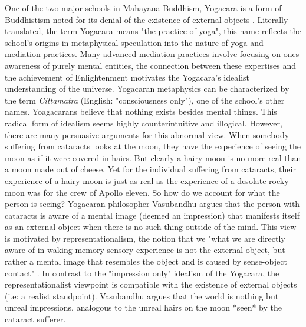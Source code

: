  One of the two major schools in Mahayana Buddhism, Yogacara is a form of Buddhistism noted for its denial of the existence of external objects \cite{siderits2007buddhism} . Literally translated, the term Yogacara means "the practice of yoga", this name reflects the school's origins in metaphysical speculation into the nature of yoga and mediation practices. Many advanced mediation practices involve focusing on ones awareness of purely mental entities, the connection between these expertises and the achievement of Enlightenment motivates the Yogacara's idealist understanding of the universe. Yogacaran metaphysics can be characterized by the term \textit{Cittamatra} (English: "consciousness only"), one of the school's other names. Yoagacarans believe that nothing exists besides mental things. This radical form of idealism seems highly counterintuitive and illogical. However, there are many persuasive arguments for this abnormal view. When somebody suffering from cataracts looks at the moon, they have the experience of seeing the moon as if it were covered in hairs. But clearly a hairy moon is no more real than a moon made out of cheese. Yet for the individual suffering from cataracts, their experience of a hairy moon is just as real as the experience of a desolate rocky moon was for the crew of Apollo eleven. So how do we account for what the person is seeing? Yogacaran philosopher Vasubandhu argues that the person with cataracts is aware of a mental image (deemed an impression) that manifests itself as an external object when there is no such thing outside of the mind. This view is motivated by representationalism, the notion that we "what we are directly aware of in waking memory sensory experience is not the external object, but rather a mental image that resembles the object and is caused by sense-object contact" \cite{siderits2007buddhism}.  \newline In contrast to the "impression only" idealism of the Yogacara, the representationalist viewpoint is compatible with the existence of external objects (i.e: a realist standpoint). Vasubandhu argues that the world is nothing but unreal impressions, analogous to the unreal hairs on the moon *seen* by the cataract sufferer.
 \newline
